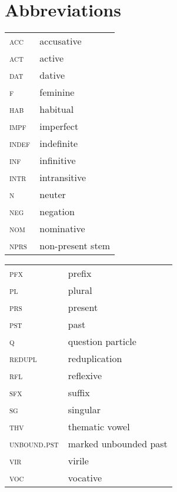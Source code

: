 \documentclass[output=paper]{langsci/langscibook}
\begin{document}
\section*{Abbreviations} 
\begin{tabularx}{.45\textwidth}{@{}>{\scshape}lX}
acc & accusative\\
act &  active\\
dat  & {dative}\\
f  & feminine\\
hab &  habitual\\
impf &  imperfect\\
indef  & indefinite\\
inf  & {infinitive}\\
intr  &      {intransitive}\\
n &  neuter\\
neg & negation\\
nom  & {nominative}\\
nprs  &        non-present stem\\
\end{tabularx}
\begin{tabularx}{.5\textwidth}{>{\scshape}ll@{}}
pfx   &       prefix\\
pl &  plural\\
prs &  present\\
pst &  past\\
q  & question particle\\
redupl &  reduplication\\
rfl &  reflexive\\
sfx  &        suffix\\
sg &  singular\\
thv   &       {thematic vowel}\\
unbound.pst  &  marked unbounded past\\
vir &  virile\\
voc  & vocative\\
\end{tabularx}

{\sloppy
\printbibliography[heading=subbibliography,notkeyword=this]
}
\end{document}

